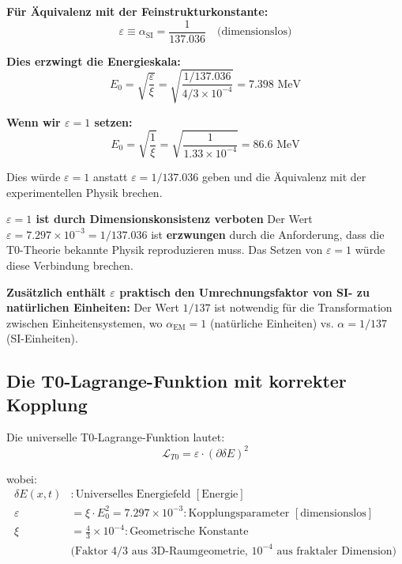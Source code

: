 \documentclass[12pt,a4paper]{article}
\numberwithin{equation}{section}
\newcommand{\xipar}{\xi}
\newcommand{\epsilonT}{\varepsilon}
\newcommand{\alphaSI}{\alpha_{\text{SI}}}
\newcommand{\calL}{\mathcal{L}}
\newcommand{\Eo}{E_0}
\begin{document}
	\textbf{Für Äquivalenz mit der Feinstrukturkonstante:}
	\begin{equation}
		\epsilonT \equiv \alphaSI = \frac{1}{137.036} \quad \text{(dimensionslos)}
		\label{eq:equivalence_simple}
	\end{equation}
	
	\textbf{Dies erzwingt die Energieskala:}
	\begin{equation}
		\Eo = \sqrt{\frac{ \epsilonT}{\xipar}} = \sqrt{\frac{1/137.036}{4/3 \times 10^{-4}}} = 7.398 \text{ MeV}
		\label{eq:e0_forced}
	\end{equation}
	
	\textbf{Wenn wir $\epsilonT = 1$ setzen:}
	\begin{equation}
		\Eo = \sqrt{\frac{1}{\xipar}} = \sqrt{\frac{1}{1.33 \times 10^{-4}}} = 86.6 \text{ MeV}
		\label{eq:e0_wrong}
	\end{equation}
	
	Dies würde $\epsilonT = 1$ anstatt $\epsilonT = 1/137.036$ geben und die Äquivalenz mit der experimentellen Physik brechen.
	
\begin{tcolorbox}[title={\textbf{SCHLUSSFOLGERUNG}},colframe=blue,colback=blue!5]
	\textbf{$\epsilonT = 1$ ist durch Dimensionskonsistenz verboten}
	Der Wert $\epsilonT = 7.297 \times 10^{-3} = 1/137.036$ ist \textbf{erzwungen} durch die Anforderung, dass die T0-Theorie bekannte Physik reproduzieren muss. Das Setzen von $\epsilonT = 1$ würde diese Verbindung brechen.
	
	\textbf{Zusätzlich enthält $\epsilonT$ praktisch den Umrechnungsfaktor von SI- zu natürlichen Einheiten:} Der Wert $1/137$ ist notwendig für die Transformation zwischen Einheitensystemen, wo $\alpha_{\text{EM}} = 1$ (natürliche Einheiten) vs. $\alpha = 1/137$ (SI-Einheiten).
\end{tcolorbox}
	
	\subsection{Die T0-Lagrange-Funktion mit korrekter Kopplung}
	
	Die universelle T0-Lagrange-Funktion lautet:
	\begin{equation}
		\calL_{T0} = \epsilonT \cdot (\partial \delta E)^2
		\label{eq:t0_lagrangian}
	\end{equation}
	
	wobei:
	\begin{align}
		\delta E(x,t) &: \text{Universelles Energiefeld } [\text{Energie}]\\
		\epsilonT &= \xipar \cdot \Eo^2 = 7.297 \times 10^{-3} : \text{Kopplungsparameter } [\text{dimensionslos}]\\
\xipar &= \frac{4}{3} \times 10^{-4} : \text{Geometrische Konstante}\\
& \text{(Faktor 4/3 aus 3D-Raumgeometrie, }10^{-4}\text{ aus fraktaler Dimension)}
	\end{align}
	
\end{document}
